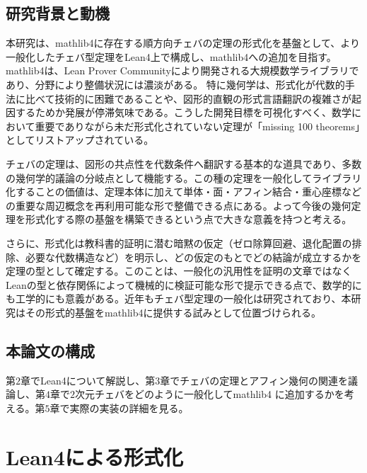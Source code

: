 \documentclass[a4paper,12pt]{bxjsbook}
\newlength{\customindent}
\newenvironment{body}{
  \par
  \begingroup
  \setlength{\leftskip}{\customindent}
  \setlength{\rightskip}{0pt}
  \setlength{\parindent}{1em}
  \setlength{\displayindent}{\customindent}
  \setlength{\displaywidth}{\dimexpr\linewidth-\customindent\relax}
}{
  \par
  \endgroup
}
\theoremstyle{theorem}
\begin{document}
    \section{研究背景と動機}
    \begin{body}
        \indent 本研究は、mathlib4に存在する順方向チェバの定理の形式化を基盤として、より一般化したチェバ型定理をLean4上で構成し、mathlib4への追加を目指す。mathlib4は、Lean Prover Communityにより開発される大規模数学ライブラリ\cite{LeanProverCommunity}であり、分野により整備状況には濃淡がある。
        特に幾何学は、形式化が代数的手法に比べて技術的に困難であることや、図形的直観の形式言語翻訳の複雑さが起因するためか発展が停滞気味である。こうした開発目標を可視化すべく、数学において重要でありながら未だ形式化されていない定理が「missing 100 theorems」としてリストアップされている。

        \indent チェバの定理は、図形の共点性を代数条件へ翻訳する基本的な道具であり、多数の幾何学的議論の分岐点として機能する。この種の定理を一般化してライブラリ化することの価値は、定理本体に加えて単体・面・アフィン結合・重心座標などの重要な周辺概念を再利用可能な形で整備できる点にある。よって今後の幾何定理を形式化する際の基盤を構築できるという点で大きな意義を持つと考える。

        \indent さらに、形式化は教科書的証明に潜む暗黙の仮定（ゼロ除算回避、退化配置の排除、必要な代数構造など）を明示し、どの仮定のもとでどの結論が成立するかを定理の型として確定する。このことは、一般化の汎用性を証明の文章ではなくLeanの型と依存関係によって機械的に検証可能な形で提示できる点で、数学的にも工学的にも意義がある。近年もチェバ型定理の一般化は研究されており、本研究はその形式的基盤をmathlib4に提供する試みとして位置づけられる。

    \end{body}

    \section{本論文の構成}
    \begin{body}
        \indent  第$2$章でLean4について解説し、第$3$章でチェバの定理とアフィン幾何の関連を議論し、第$4$章で$2$次元チェバをどのように一般化してmathlib4 に追加するかを考える。第$5$章で実際の実装の詳細を見る。
    \end{body}


    \chapter{Lean4による形式化}
\end{document}
